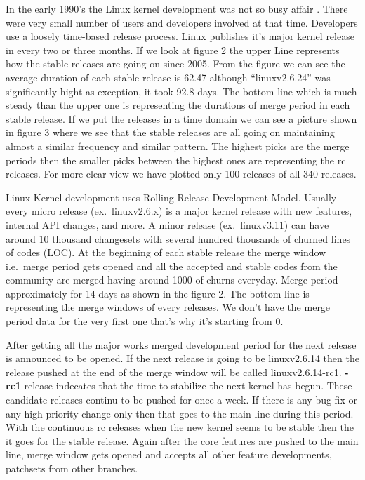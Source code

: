 \documentclass{acm_proc_article-sp}
\begin{document}
In the early 1990's the Linux kernel development was not so busy affair \cite{linux_kernel}. There were very small number of users and developers involved at that time. Developers use a loosely time-based release process. Linux publishes it's major kernel release in every two or three months. If we look at figure 2 the upper Line represents how the stable releases are going on since 2005. From the figure we can see the average duration of each stable release is 62.47 although ``linuxv2.6.24'' was significantly hight as exception, it took 92.8 days. The bottom line which is much steady than the upper one is representing the durations of merge period in each stable release. If we put the releases in a time domain we can see a picture shown in figure 3 where we see that the stable releases are all going on maintaining almost a similar frequency and similar pattern. The highest picks are the merge periods then the smaller picks between the highest ones are representing the rc releases. For more clear view we have plotted only 100 releases of all 340 releases.

Linux Kernel development uses Rolling Release Development Model. Usually every micro release (ex.\ linuxv2.6.x) is a major kernel release with new features, internal API changes, and more. A minor release (ex.\ linuxv3.11) can have around  10 thousand changesets with several hundred thousands of churned lines of  codes (LOC). At the beginning of each stable release the merge window i.e.\ merge period gets opened and all the accepted and stable codes from the community are merged having around 1000 of churns everyday. Merge period approximately for 14 days as shown in the figure 2. The bottom line is representing the merge windows of every releases. We don't have the merge period data for the very first one that's why it's starting from 0.

After getting all the major works merged development period for the next release is announced to be opened. If the next release is going to be linuxv2.6.14 then the release pushed at the end of the merge window will be called linuxv2.6.14-rc1. \textbf{-rc1} release indecates that the time to stabilize the next kernel has begun. These candidate releases continu to be pushed for once a week. If there is any bug fix or any high-priority change only then that goes to the main line during this period. With the continuous rc releases when the new kernel seems to be stable then the it goes for the stable release. Again after the core features are pushed to the main line, merge window gets opened and accepts all other feature developments, patchsets from other branches.
\end{document}
